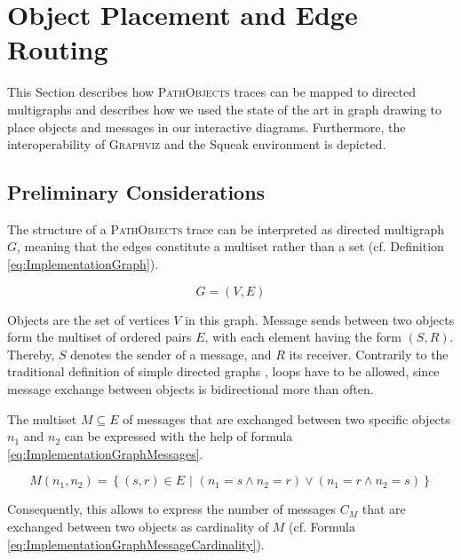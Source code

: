 \section[Object Placement and Edge Routing]{Object Placement and Edge Routing%
}
\label{s:ImplementationLayouting}

This Section describes how \textsc{PathObjects} traces can be mapped to directed multigraphs and describes how we used the state of the art in graph drawing to place objects and messages in our interactive diagrams.
Furthermore, the interoperability of \textsc{Graphviz} and the Squeak environment is depicted.

\subsection{Preliminary Considerations}
The structure of a \textsc{PathObjects} trace can be interpreted as directed multigraph $G$, meaning that the edges constitute a multiset rather than a set (cf. Definition \ref{eq:ImplementationGraph}).

\begin{equation}
G = (V, E)
\label{eq:ImplementationGraph}
\end{equation}

Objects are the set of vertices $V$ in this graph.
Message sends between two objects form the multiset of ordered pairs $E$, with each element having the form $(S,R)$.
Thereby, $S$ denotes the sender of a message, and $R$ its receiver.
Contrarily to the traditional definition of simple directed graphs \cite{berge_graphs_1985}, loops have to be allowed, since message exchange between objects is bidirectional more than often.

The multiset $M \subseteq E$ of messages that are exchanged between two specific objects $n_1$ and $n_2$ can be expressed with the help of formula \ref{eq:ImplementationGraphMessages}.

\begin{equation}
M(n_1, n_2) = \left\{ (s,r) \in E \phantom{i}| \phantom{i} (n_1 = s \land n_2 = r) \lor (n_1 = r \land n_2 = s) \right\}
\label{eq:ImplementationGraphMessages}
\end{equation}

Consequently, this allows to express the number of messages $C_M$ that are exchanged between two objects as cardinality of $M$ (cf. Formula \ref{eq:ImplementationGraphMessageCardinality}).

